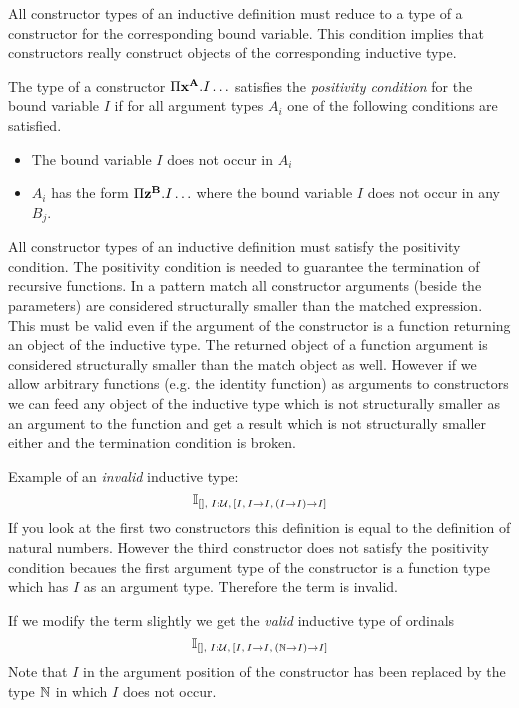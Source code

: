 All constructor types of an inductive definition must reduce to a type of a
constructor for the corresponding bound variable. This condition implies that
constructors really construct objects of the corresponding inductive type.


\begin{definition}
  The type of a constructor $\Pi \mathbf{x}^{\mathbf{A}}. I \ldots$ satisfies the
  \emph{positivity condition} for the bound variable $I$ if for all argument
  types $A_i$ one of the following conditions are satisfied.
  \begin{itemize}
  \item The bound variable $I$ does not occur in $A_i$

  \item $A_i$ has the form $\Pi \mathbf{z}^{\mathbf{B}} . I \ldots$ where the bound
    variable $I$ does not occur in any $B_j$.
  \end{itemize}
\end{definition}

All constructor types of an inductive definition must satisfy the positivity
condition. The positivity condition is needed to guarantee the termination of
recursive functions. In a pattern match all constructor arguments (beside the
parameters) are considered structurally smaller than the matched
expression. This must be valid even if the argument of the constructor is a
function returning an object of the inductive type. The returned object of a
function argument is considered structurally smaller than the match object as
well. However if we allow arbitrary functions (e.g. the identity function) as
arguments to constructors we can feed any object of the inductive type which
is not structurally smaller as an argument to the function and get a result
which is not structurally smaller either and the termination condition is
broken.

Example of an \emph{invalid} inductive type:
$$
\mathbb{I}_{[],\; I:{\cal{U}},\, [I,\, I \to I, \, (I \to I) \to I]}
$$
If you look at the first two constructors this definition is equal to the
definition of natural numbers. However the third constructor does not satisfy
the positivity condition becaues the first argument type of the constructor is
a function type which has $I$ as an argument type. Therefore the term is
invalid.

If we modify the term slightly we get the \emph{valid} inductive type of
ordinals
$$
\mathbb{I}_{[],\; I:{\cal{U}},\, [I,\, I \to I, \, ({\mathbb{N}} \to I) \to I]}
$$
Note that $I$ in the argument position of the constructor has been
replaced by the type ${\mathbb{N}}$ in which $I$ does not occur.




